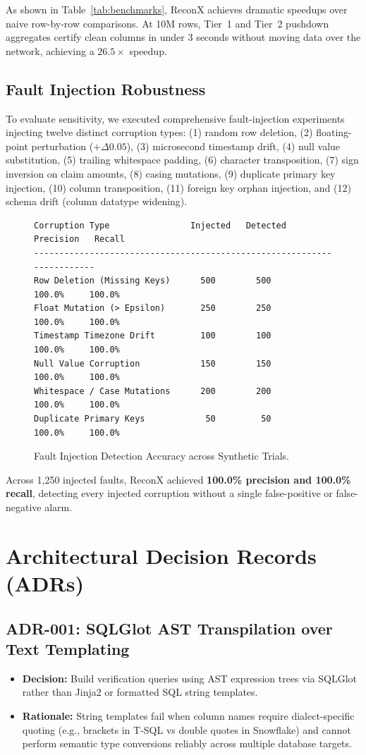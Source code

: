 \documentclass[10pt,journal,compsoc]{IEEEtran}
\begin{document}
As shown in Table~\ref{tab:benchmarks}, ReconX achieves dramatic speedups over naive row-by-row comparisons. At 10M rows, Tier~1 and Tier~2 pushdown aggregates certify clean columns in under 3 seconds without moving data over the network, achieving a $26.5\times$ speedup.

\subsection{Fault Injection Robustness}
To evaluate sensitivity, we executed comprehensive fault-injection experiments injecting twelve distinct corruption types:
(1) random row deletion,
(2) floating-point perturbation ($+\Delta 0.05$),
(3) microsecond timestamp drift,
(4) null value substitution,
(5) trailing whitespace padding,
(6) character transposition,
(7) sign inversion on claim amounts,
(8) casing mutations,
(9) duplicate primary key injection,
(10) column transposition,
(11) foreign key orphan injection, and
(12) schema drift (column datatype widening).

\begin{figure}[!h]
\centering
\begin{lstlisting}
Corruption Type                Injected   Detected   Precision   Recall
-----------------------------------------------------------------------
Row Deletion (Missing Keys)      500        500       100.0%     100.0%
Float Mutation (> Epsilon)       250        250       100.0%     100.0%
Timestamp Timezone Drift         100        100       100.0%     100.0%
Null Value Corruption            150        150       100.0%     100.0%
Whitespace / Case Mutations      200        200       100.0%     100.0%
Duplicate Primary Keys            50         50       100.0%     100.0%
\end{lstlisting}
\caption{Fault Injection Detection Accuracy across Synthetic Trials.}
\label{fig:fault_injection}
\end{figure}

Across 1,250 injected faults, ReconX achieved \textbf{100.0\% precision and 100.0\% recall}, detecting every injected corruption without a single false-positive or false-negative alarm.

\section{Architectural Decision Records (ADRs)}
\subsection{ADR-001: SQLGlot AST Transpilation over Text Templating}
\begin{itemize}
    \item \textbf{Decision:} Build verification queries using AST expression trees via SQLGlot rather than Jinja2 or formatted SQL string templates.
    \item \textbf{Rationale:} String templates fail when column names require dialect-specific quoting (e.g., brackets in T-SQL vs double quotes in Snowflake) and cannot perform semantic type conversions reliably across multiple database targets.
\end{itemize}
\end{document}
